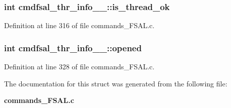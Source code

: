 \subsubsection[{is\_\-thread\_\-ok}]{\setlength{\rightskip}{0pt plus 5cm}int {\bf cmdfsal\_\-thr\_\-info\_\-\_\-::is\_\-thread\_\-ok}}\label{structcmdfsal__thr__info_____7e4c866d22d03872cb0905d73d41dbb6}




Definition at line 316 of file commands\_\-FSAL.c.
\subsubsection[{opened}]{\setlength{\rightskip}{0pt plus 5cm}int {\bf cmdfsal\_\-thr\_\-info\_\-\_\-::opened}}\label{structcmdfsal__thr__info_____a3532ab85e3b4baab2ba7b386c4d08d0}




Definition at line 328 of file commands\_\-FSAL.c.

The documentation for this struct was generated from the following file:\begin{CompactItemize}
\item 
{\bf commands\_\-FSAL.c}\end{CompactItemize}
